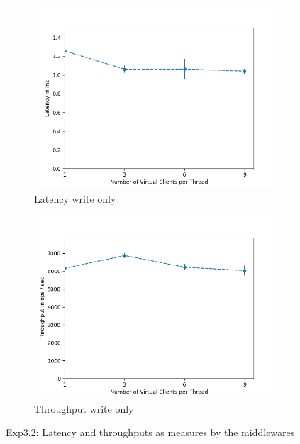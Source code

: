 \documentclass[11pt,a4paper]{article}
\begin{document}
\begin{figure}[H]
\centering
\begin{subfigure}{.5\textwidth}
    \centering
    \includegraphics[width=\textwidth]{img/exp5_1/exp5_1__mw_latency_sharding_True.png}
    \caption{Latency write only}
    \label{fig:mesh1}
\end{subfigure}%
\begin{subfigure}{.5\textwidth}
      \centering
    \includegraphics[width=\textwidth]{img/exp5_1/exp5_1__mw_throughput_sharding_True.png}
    \caption{Throughput write only}
    \label{fig:mesh1}
\end{subfigure}
\caption{Exp3.2: Latency and throughputs as measures by the middlewares}
\label{fig:test}
\end{figure}
\end{document}
